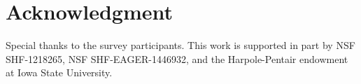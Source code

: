 \documentclass{sig-alternate-05-2015}
\begin{document}
\section*{Acknowledgment}
Special thanks to the  survey participants.
This work is supported in part by NSF SHF-1218265, NSF SHF-EAGER-1446932, and the Harpole-Pentair endowment at Iowa State University.

\newpage

\balance

\end{document}
